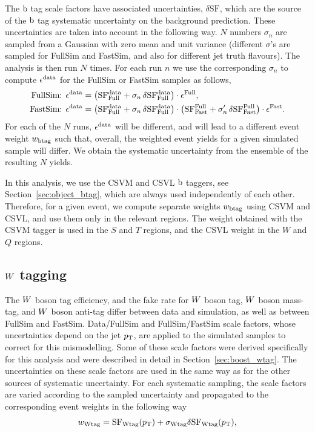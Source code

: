 The $\mathrm{b}$ tag scale factors have associated uncertainties, $\delta\mathrm{SF}$, which are the
source of the $\mathrm{b}$ tag systematic uncertainty on the background prediction. 
These uncertainties are taken into account in the following way.
$N$ numbers $\sigma_n$ are sampled from a Gaussian with zero mean and unit variance
(different $\sigma$'s are sampled for FullSim and FastSim, and also for different jet truth
flavours). The analysis is then run $N$ times. For each run $n$ we use the corresponding $\sigma_n$
to compute $\epsilon^{\rm data}$ for the FullSim or FastSim samples as follows, 
\begin{align}
\textrm{FullSim: } \epsilon^{\rm data} &= \left(\mathrm{SF^{data}_{Full}} + \sigma_n \, \delta
\mathrm{SF^{data}_{Full}} \right) \cdot \epsilon^{\rm Full} , \\
\textrm{FastSim: } \epsilon^{\rm data} &= \left(\mathrm{SF^{data}_{Full}} + \sigma_n \, \delta
\mathrm{SF^{data}_{Full}}\right) \cdot \left(\mathrm{SF^{Full}_{Fast}} + \sigma_n' \, \delta
\mathrm{SF^{Full}_{Fast}} \right) \cdot \epsilon^{\rm Fast}.
\end{align}
For each of the $N$ runs, $\epsilon^{\rm data}$ will be different, and will lead to a different
event weight $w_{\rm btag}$ such that, overall, the weighted event yields for a given simulated
sample will differ. 
We obtain the systematic uncertainty from the ensemble of the resulting $N$ yields.

In this analysis, we use the CSVM and CSVL $\mathrm{b}$ taggers, see Section~\ref{sec:object_btag}, which
are always used independently of each other. Therefore, for a given event, we compute separate
weights
$w_{\rm btag}$ using CSVM and CSVL, and use them only in the relevant regions. The weight obtained
with the CSVM tagger is used in the $S$ and $T$ regions, and the CSVL weight in the $W$ and $Q$
regions.

\subsection{\texorpdfstring{$W$}{W} tagging} 

The $W$ boson tag efficiency, and the fake rate for $W$ boson tag, $W$ boson mass-tag, and $W$
boson anti-tag differ between data and simulation, as well as between FullSim and FastSim. 
Data/FullSim and FullSim/FastSim scale factors, whose uncertainties depend on the jet $p_{\mathrm{T}}$,
are applied to the simulated samples to correct for this mismodelling.
Some of these scale factors were derived specifically for this analysis and were described in detail
in Section~\ref{sec:boost_wtag}.
The uncertainties on these scale factors are used in the same way as for the other sources of
systematic uncertainty. For each systematic sampling, the scale factors are varied according to the
sampled uncertainty and propagated to the corresponding event weights in the following way
\begin{equation}
w_{\rm Wtag} = {\rm SF_{Wtag}}(p_{\mathrm{T}}) + \sigma_{\rm Wtag} \delta {\rm SF_{Wtag}}(p_{\mathrm{T}}), 
\end{equation}

